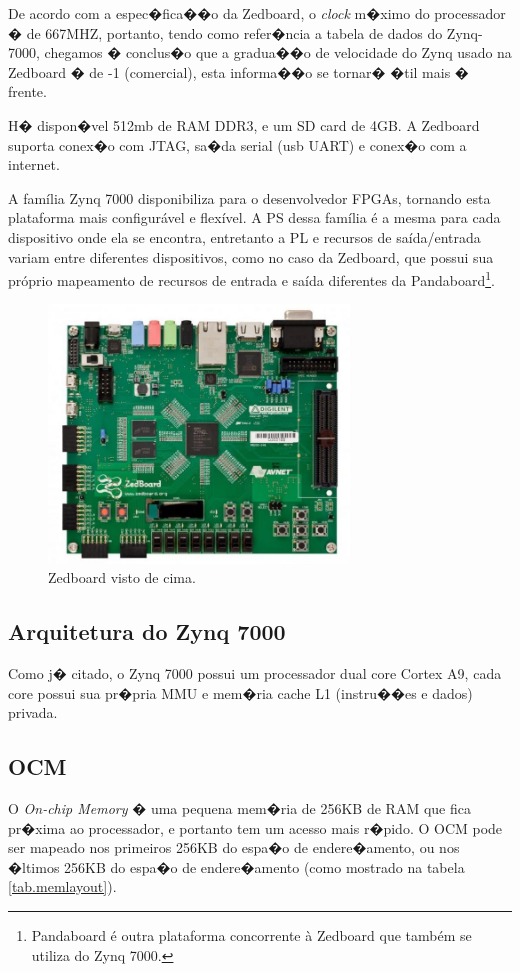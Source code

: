 \documentclass{ufscThesis/ufscThesis} %
\begin{document}
De acordo com a espec�fica��o da Zedboard\cite{zedboard}, o \emph{clock} m�ximo do processador � de 667MHZ, portanto, tendo como refer�ncia a tabela de dados do Zynq-7000\cite[p.~13]{data_sheet}, chegamos � conclus�o que a gradua��o de velocidade do Zynq usado na Zedboard � de -1 (comercial), esta informa��o se tornar� �til mais � frente.

H� dispon�vel 512mb de RAM DDR3, e um SD card de 4GB. A Zedboard suporta conex�o com JTAG, sa�da serial (usb UART) e conex�o com a internet\cite{xilinx}.

A família Zynq 7000 disponibiliza para o desenvolvedor FPGAs, tornando esta plataforma mais configurável e flexível\cite[p.~26]{ug585}. A PS dessa família é a mesma para cada dispositivo onde ela se encontra, entretanto a PL e recursos de saída/entrada variam entre diferentes dispositivos, como no caso da Zedboard, que possui sua próprio mapeamento de recursos de entrada e saída diferentes da Pandaboard\footnote{Pandaboard é outra plataforma concorrente à Zedboard que também se utiliza do Zynq 7000.}.


\begin{figure}[ht!]
    \centering
    \includegraphics[width=8cm]{figuras/zedboard}
    \caption{Zedboard visto de cima.}
\end{figure}

\subsection{Arquitetura do Zynq 7000}
Como j� citado, o Zynq 7000 possui um processador dual core Cortex A9, cada core possui sua pr�pria MMU e mem�ria cache L1 (instru��es e dados) privada.

\subsection{OCM} O \emph{On-chip Memory} � uma pequena mem�ria de 256KB de RAM que fica pr�xima ao processador, e portanto tem um acesso mais r�pido. O OCM pode ser mapeado nos primeiros 256KB do espa�o de endere�amento, ou nos �ltimos 256KB do espa�o de endere�amento\cite{ug585} (como mostrado na tabela \ref{tab.memlayout}).
\end{document}
